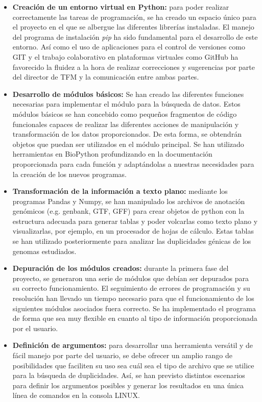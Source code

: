 \begin{itemize}
    \item \textbf{Creación de un entorno virtual en Python: }para poder realizar correctamente las tareas de programación, se ha creado un espacio único para el proyecto en el que se albergue las diferentes librerías instaladas. El manejo del programa de instalación \textit{pip} ha sido fundamental para el desarrollo de este entorno. Así como el uso de aplicaciones para el control de versiones como GIT y el trabajo colaborativo en plataformas virtuales como GitHub ha favorecido la fluidez a la hora de realizar correcciones y sugerencias por parte del director de TFM y la comunicación entre ambas partes.
    
    \item \textbf{Desarrollo de módulos básicos: }Se han creado las diferentes funciones necesarias para implementar el módulo para la búsqueda de datos. Estos módulos básicos se han concebido como pequeños fragmentos de código funcionales capaces de realizar las diferentes acciones de manipulación y transformación de los datos proporcionados. De esta forma, se obtendrán objetos que puedan ser utilizados en el módulo principal. Se han utilizado herramientas en BioPython profundizando en la documentación proporcionada para cada función y adaptándolas a nuestras necesidades para la creación de los nuevos programas.
    
    \item \textbf{Transformación de la información a texto plano: }mediante los programas Pandas y Numpy, se han manipulado los archivos de anotación genómicos (e.g. genbank, GTF, GFF) para crear objetos de python con la estructura adecuada para generar tablas y poder volcarlas como texto plano y visualizarlas, por ejemplo, en un procesador de hojas de cálculo. Estas tablas se han utilizado posteriormente para analizar las duplicidades génicas de los genomas estudiados.
    
    \item \textbf{Depuración de los módulos creados: }durante la primera fase del proyecto, se generaron una serie de módulos que debían ser depurados para su correcto funcionamiento. El seguimiento de errores de programación y su resolución han llevado un tiempo necesario para que el funcionamiento de los siguientes módulos asociados fuera correcto. Se ha implementado el programa de forma que sea muy flexible en cuanto al tipo de información proporcionada por el usuario.
    
    \item \textbf{Definición de argumentos: }para desarrollar una herramienta versátil y de fácil manejo por parte del usuario, se debe ofrecer un amplio rango de posibilidades que faciliten su uso sea cuál sea el tipo de archivo que se utilice para la búsqueda de duplicidades. Así, se han previsto distintos escenarios para definir los argumentos posibles y generar los resultados en una única línea de comandos en la consola LINUX.
    

\end{itemize}
